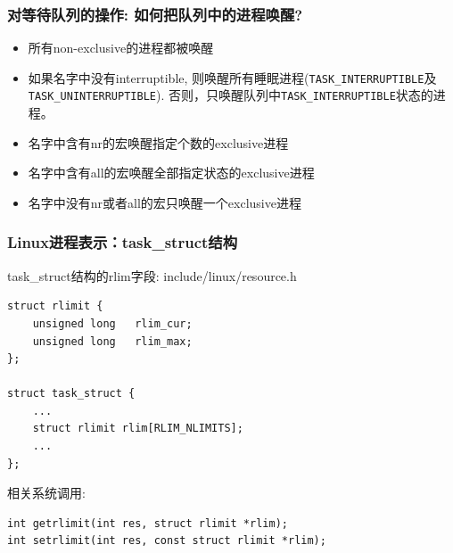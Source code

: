 \documentclass[xcolor=svgnames]{beamer}
\begin{document}
\begin{CJK*}{UTF8}{gbsn}
\begin{frame}[fragile]
\frametitle{对等待队列的操作: 如何把队列中的进程唤醒?}
\begin{itemize}
\item 所有non-exclusive的进程都被唤醒
\item 如果名字中没有interruptible, 则唤醒所有睡眠进程(\verb|TASK_INTERRUPTIBLE|及\verb|TASK_UNINTERRUPTIBLE|).
否则，只唤醒队列中\verb|TASK_INTERRUPTIBLE|状态的进程。
\item 名字中含有nr的宏唤醒指定个数的exclusive进程
\item 名字中含有all的宏唤醒全部指定状态的exclusive进程
\item 名字中没有nr或者all的宏只唤醒一个exclusive进程
\end{itemize}
\end{frame}


\begin{frame}[fragile]
\frametitle{Linux进程表示：task\_struct结构}
\begin{block}{task\_struct结构的rlim字段: include/linux/resource.h}
\begin{verbatim}
struct rlimit {
    unsigned long   rlim_cur;
    unsigned long   rlim_max;
};

struct task_struct {
    ...
    struct rlimit rlim[RLIM_NLIMITS];
    ...
};
\end{verbatim}
\end{block}
\begin{block}{相关系统调用:}
\begin{verbatim}
int getrlimit(int res, struct rlimit *rlim);
int setrlimit(int res, const struct rlimit *rlim);
\end{verbatim}
\end{block}
\end{frame}


\end{CJK*}
\end{document}
